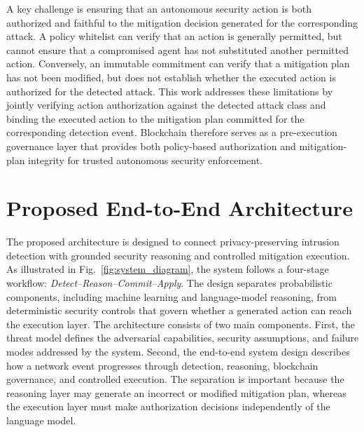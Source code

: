 \documentclass[10pt, conference]{IEEEtran}
\begin{document}
A key challenge is ensuring that an autonomous security action is both authorized and faithful to the mitigation decision generated for the corresponding attack. A policy whitelist can verify that an action is generally permitted, but cannot ensure that a compromised agent has not substituted another permitted action. Conversely, an immutable commitment can verify that a mitigation plan has not been modified, but does not establish whether the executed action is authorized for the detected attack. This work addresses these limitations by jointly verifying action authorization against the detected attack class and binding the executed action to the mitigation plan committed for the corresponding detection event. Blockchain therefore serves as a pre-execution governance layer that provides both policy-based authorization and mitigation-plan integrity for trusted autonomous security enforcement.




\section{Proposed End-to-End Architecture}
\label{sec:system}

The proposed architecture is designed to connect privacy-preserving intrusion detection with grounded security reasoning and controlled mitigation execution. As illustrated in Fig.~\ref{fig:system_diagram}, the system follows a four-stage workflow: \emph{Detect--Reason--Commit--Apply}. The design separates probabilistic components, including machine learning and language-model reasoning, from deterministic security controls that govern whether a generated action can reach the execution layer. The architecture consists of two main components. First, the threat model defines the adversarial capabilities, security assumptions, and failure modes addressed by the system. Second, the end-to-end system design describes how a network event progresses through detection, reasoning, blockchain governance, and controlled execution. The separation is important because the reasoning layer may generate an incorrect or modified mitigation plan, whereas the execution layer must make authorization decisions independently of the language model.
\end{document}
